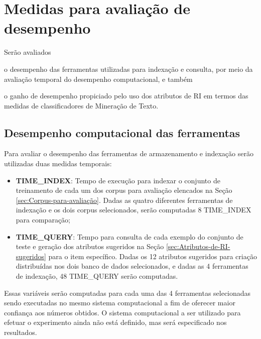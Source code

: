     

\section{Medidas para avaliação de desempenho}  \label{sec:Medidas-para-avaliação-de-desempenho}
    Serão avaliados
    \begin{enumerate*}[label=(\alph*)]
        \item o desempenho das ferramentas utilizadas para indexação e consulta, por meio da avaliação temporal do desempenho computacional, e também
        \item o ganho de desempenho propiciado pelo uso dos atributos de RI em termos das medidas de classificadores de Mineração de Texto. 
    \end{enumerate*} 
    
    \subsection{Desempenho computacional das ferramentas}  \label{subsec:Desempenho-computacional}
        Para avaliar o desempenho das ferramentas de armazenamento e indexação serão utilizadas duas medidas temporais:
        \begin{itemize}
            \item \textbf{TIME\_INDEX}: Tempo de execução para indexar o conjunto de treinamento de cada um dos corpus para avaliação elencados na Seção \ref{sec:Corpus-para-avaliação}. Dadas as quatro diferentes ferramentas de indexação e os dois corpus selecionados, serão computadas 8 TIME\_INDEX para comparação;
            
            \item \textbf{TIME\_QUERY}: Tempo para consulta de cada exemplo do conjunto de teste e geração dos atributos sugeridos na Seção \ref{sec:Atributos-de-RI-sugeridos} para o item específico. Dadas os 12 atributos sugeridos para criação distribuídas nos dois banco de dados selecionados, e dadas as 4 ferramentas de indexação, 48 TIME\_QUERY serão computadas.  
        \end{itemize}
        
        Essas variáveis serão computadas para cada uma das 4 ferramentas selecionadas sendo executadas no mesmo sistema computacional a fim de oferecer maior confiança aos números obtidos. 
        O sistema computacional a ser utilizado para efetuar o experimento ainda não está definido, mas será especificado nos resultados.
    
